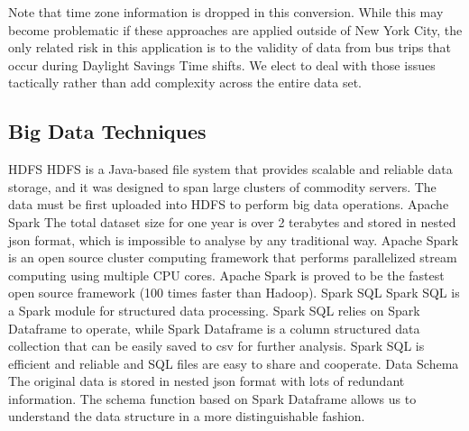 \documentclass[12pt]{report}
\begin{document}
\vspace{0.5cm}

Note that time zone information is dropped in this conversion.  While this may become problematic if these approaches are applied outside of New York City, the only related risk in this application is to the validity of data from bus trips that occur during Daylight Savings Time shifts.  We elect to deal with those issues tactically rather than add complexity across the entire data set.

\subsection{Big Data Techniques}

HDFS
HDFS is a Java-based file system that provides scalable and reliable data storage, and it was designed to span large clusters of commodity servers.
The data must be first uploaded into HDFS to perform big data operations.
Apache Spark 
The total dataset size for one year is over 2 terabytes and stored in nested json format, which is impossible to analyse by any traditional way.
Apache Spark is an open source cluster computing framework that performs parallelized stream computing using multiple CPU cores. Apache Spark is proved to be the fastest open source framework (100 times faster than Hadoop).
Spark SQL
Spark SQL is a Spark module for structured data processing.  Spark SQL relies on Spark Dataframe to operate, while Spark Dataframe is a column structured data collection that can be easily saved to csv for further analysis. 
Spark SQL is efficient and reliable and SQL files are easy to share and cooperate.
Data Schema
The original data is stored in nested json format with lots of redundant information.
The schema function based on Spark Dataframe allows us to understand the data structure in a more distinguishable fashion.
\end{document}
